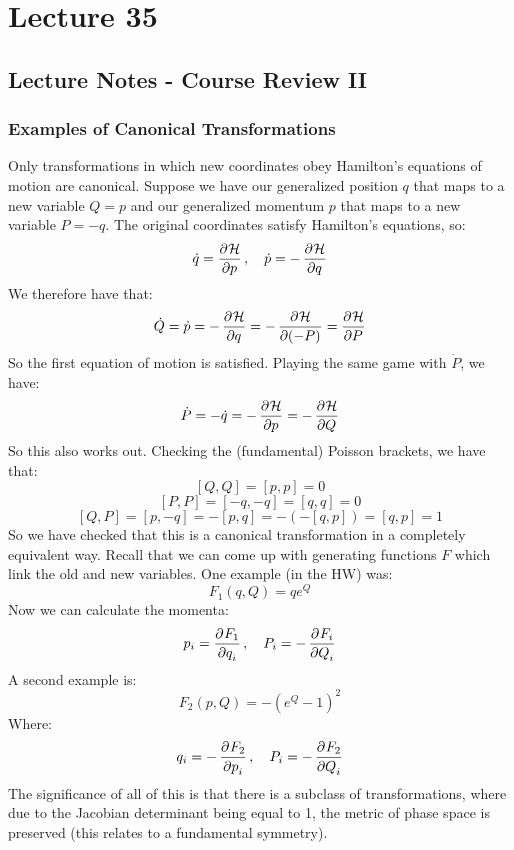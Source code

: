 \section{Lecture 35}
\subsection{Lecture Notes - Course Review II}
\subsubsection{Examples of Canonical Transformations}
Only transformations in which new coordinates obey Hamilton's equations of motion are canonical. Suppose we have our generalized position $q$ that maps to a new variable $Q = p$ and our generalized momentum $p$ that maps to a new variable $P = -q$. The original coordinates satisfy Hamilton's equations, so:
\[\dot{q} = \dpd{\HH}{p}, \quad \dot{p} = -\dpd{\HH}{q}\]
We therefore have that:
\[\dot{Q} = \dot{p} = -\dpd{\HH}{q} = -\dpd{\HH}{(-P)} = \dpd{\HH}{P}\]
So the first equation of motion is satisfied. Playing the same game with $\dot{P}$, we have:
\[\dot{P} = -\dot{q} = -\dpd{\HH}{p} = -\dpd{\HH}{Q}\]
So this also works out. Checking the (fundamental) Poisson brackets, we have that:
\[[Q, Q] = [p, p] = 0\]
\[[P, P] = [-q, -q] = [q, q] = 0\]
\[[Q, P] = [p, -q] = -[p, q] = -(-[q, p]) = [q, p] = 1\]
So we have checked that this is a canonical transformation in a completely equivalent way. Recall that we can come up with generating functions $F$ which link the old and new variables. One example (in the HW) was:
\[F_1(q, Q) = qe^Q\]
Now we can calculate the momenta:
\[p_i = \dpd{F_1}{q_i}, \quad P_i = -\dpd{F_i}{Q_i}\]
A second example is:
\[F_2(p, Q) = -(e^Q - 1)^2\]
Where:
\[q_i = -\dpd{F_2}{p_i}, \quad P_i = -\dpd{F_2}{Q_i}\]
The significance of all of this is that there is a subclass of transformations, where due to the Jacobian determinant being equal to 1, the metric of phase space is preserved (this relates to a fundamental symmetry). 

